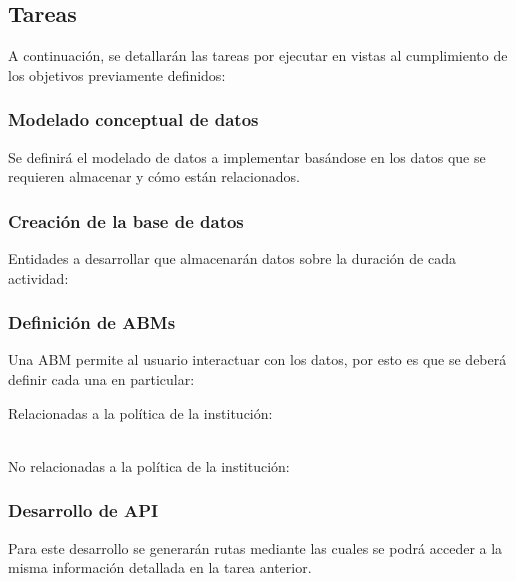 
\subsection{Tareas}%
\label{sub:tareas}
A continuación, se detallarán las tareas por ejecutar en vistas al cumplimiento de los objetivos previamente definidos:

\subsubsection{Modelado conceptual de datos}%
\label{ssub:modelado_conceptual_de_datos}
Se definirá el modelado de datos a implementar basándose en los datos que se requieren almacenar y cómo están relacionados.

\subsubsection{Creación de la base de datos}
\label{ssub:creacionDB}

Entidades a desarrollar que almacenarán datos  sobre la duración de cada actividad:

\begin{itemize}
    
\end{itemize}

\subsubsection{Definición de ABMs}%
\label{ssub:definicionABMS}


Una ABM permite al usuario interactuar con los datos, por esto es que se deberá definir cada una en particular:\newline

Relacionadas a la política de la institución:
\begin{itemize}
    
\end{itemize}
\ \\No relacionadas a la política de la institución:
\begin{itemize}
    
\end{itemize}

\subsubsection{Desarrollo de API }%
\label{ssub:desarrollo_de_api_}
Para este desarrollo se generarán rutas mediante las cuales se podrá acceder a la misma información detallada en la tarea anterior.

